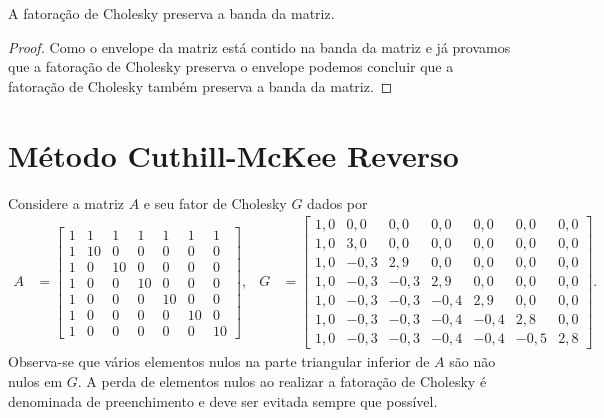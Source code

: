\begin{prop}
    \label{prop:pres:band}
    A fatoração de Cholesky preserva a banda da matriz.
\end{prop}
\begin{proof}
    Como o envelope da matriz está contido na banda da matriz e já provamos que
    a fatoração de Cholesky preserva o envelope podemos concluir que a fatoração
    de Cholesky também preserva a banda da matriz.
\end{proof}

\section{Método Cuthill-McKee Reverso}
Considere a matriz $A$ e seu fator de Cholesky $G$ dados por
\begin{align*}
    A &= \begin{bmatrix}
        1 &  1 &  1 &  1 &  1 &  1 &  1 \\
        1 & 10 &  0 &  0 &  0 &  0 &  0 \\
        1 &  0 & 10 &  0 &  0 &  0 &  0 \\
        1 &  0 &  0 & 10 &  0 &  0 &  0 \\
        1 &  0 &  0 &  0 & 10 &  0 &  0 \\
        1 &  0 &  0 &  0 &  0 & 10 &  0 \\
        1 &  0 &  0 &  0 &  0 &  0 & 10
    \end{bmatrix}, & G &= \begin{bmatrix}
        1,0 &  0,0 &  0,0 &  0,0 &  0,0 &  0,0 &  0,0 \\
        1,0 &  3,0 &  0,0 &  0,0 &  0,0 &  0,0 &  0,0 \\
        1,0 & -0,3 &  2,9 &  0,0 &  0,0 &  0,0 &  0,0 \\
        1,0 & -0,3 & -0,3 &  2,9 &  0,0 &  0,0 &  0,0 \\
        1,0 & -0,3 & -0,3 & -0,4 &  2,9 &  0,0 &  0,0 \\
        1,0 & -0,3 & -0,3 & -0,4 & -0,4 &  2,8 &  0,0 \\
        1,0 & -0,3 & -0,3 & -0,4 & -0,4 & -0,5 &  2,8
    \end{bmatrix}.
\end{align*}
Observa-se que vários elementos nulos na parte triangular inferior de $A$ são
não nulos em $G$. A perda de elementos nulos ao realizar a fatoração de
Cholesky é denominada de preenchimento e deve ser evitada sempre que possível.

